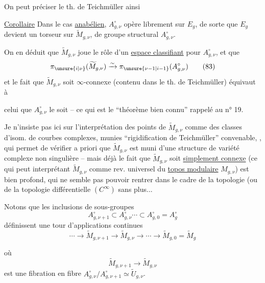 On peut préciser le th. de Teichmüller ainsi

\uline{Corollaire} Dans le cas \uline{anabélien}, \(A_{g,\nu}^{\circ}\) opère librement sur \(E_g\), de sorte que \(E_g\) devient un torseur sur \(\widetilde M_{g,\nu}\), de groupe structural \(A_{g,\nu}^{\circ}\).

On en déduit que \(\widetilde M_{g,\nu}\) joue le rôle d'un \uline{espace classifiant} pour \(A_{g,\nu}^{\circ}\), et que
\[
 \pi_{\unsure{i|\nu}}(\widetilde M_{g,\nu})
 \xrightarrow{\sim} \pi_{\unsure{\nu-1|i-1}}(A_{g,\nu}^{\circ})
 \tag{83}
\]
et le fait que \(\widetilde M_{g,\nu}\) soit \(\infty\)-connexe (contenu dans le th. de Teichmüller) équivaut à

celui que \(A_{g,\nu}^{\circ}\) le soit -- ce qui est le ``théorème bien connu'' rappelé au n° 19.

Je n'insiste pas ici sur l'interprétation des points de \(\widetilde M_{g,\nu}\) comme des classes d'isom. de courbes complexes, munies   ``rigidification de Teichmüller'' convenable, , qui permet de vérifier a priori que \(\widetilde M_{g,\nu}\) est muni d'une structure de variété complexe non singulière -- mais déjà le fait que \(\widetilde M_{g,\nu}\) soit \uline{simplement connexe} (ce qui peut   interprétant \(\widetilde M_{g,\nu}\) comme rev. universel du \uline{topos modulaire} \(M_{g,\nu}\)) est bien profond, qui ne semble pas pouvoir rentrer dans le cadre de la topologie (ou de la topologie différentielle \((C^\infty)\) sans plus...


Notons que les inclusions de sous-groupes
\[
 A_{g,\nu+1}^{\circ}\subset A_{g,\nu}^{\circ}\cdots\subset A_{g,0}^{\circ}=A_g^{\circ}
\]
définissent une tour d'applications continues
\[
 \cdots\longrightarrow\widetilde M_{g,\nu+1}\longrightarrow\widetilde M_{g,\nu}
 \longrightarrow\cdots\longrightarrow\widetilde M_{g,0}=\widetilde M_g
 \tag{84}
\]

où
\[
 \widetilde M_{g,\nu+1}\longrightarrow\widetilde M_{g,\nu}
 \tag{85}
\]
est  une fibration en fibre \(A_{g,\nu}^{\circ}/A_{g,\nu+1}^{\circ}\simeq\widetilde U_{g,\nu}\).

